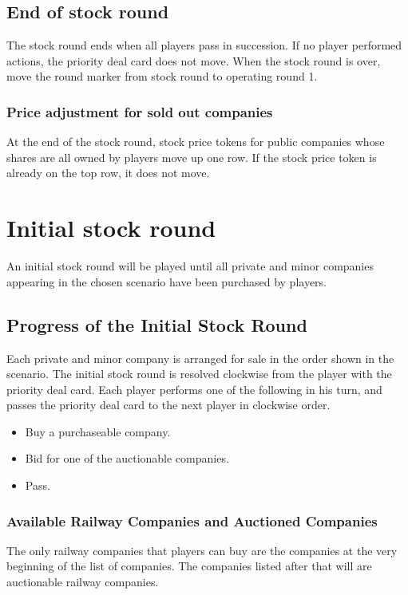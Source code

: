 \documentclass{article}
\begin{document}
\begin{CJK}{UTF8}{min}
\begin{multicols}{2}
\subsection{End of stock round} \label{sr-end-of-sr}
The stock round ends when all players pass in succession. If no
player performed actions, the priority deal card does not move. When
the stock round is over, move the round marker from stock round to
operating round 1.

\subsubsection{Price adjustment for sold out companies}
\label{sr-sold-out}
At the end of the stock round, stock price tokens for public companies
whose shares are all owned by players move up one
row. If the stock price token is already on the top row, it does not move.


\section{Initial stock round}\label{isr}
An initial stock round will be played until all private and minor
companies appearing in the chosen scenario have been purchased by
players.

\subsection{Progress of the Initial Stock Round}
Each private and minor company is arranged for sale in the order shown in the
scenario. The initial stock round is resolved clockwise from the
player with the priority deal card. Each player performs one
of the following in his turn, and passes the priority deal
card to the next player in clockwise order.

\begin{itemize}
\item Buy a purchaseable company.
\item Bid for one of the auctionable companies.
\item Pass.
\end{itemize}

\subsubsection{Available Railway Companies and Auctioned Companies}
The only railway companies that players can buy are the companies at
the very beginning of the list of companies. The companies listed
after that will are auctionable railway companies.


\end{multicols}
\end{CJK}
\end{document}
